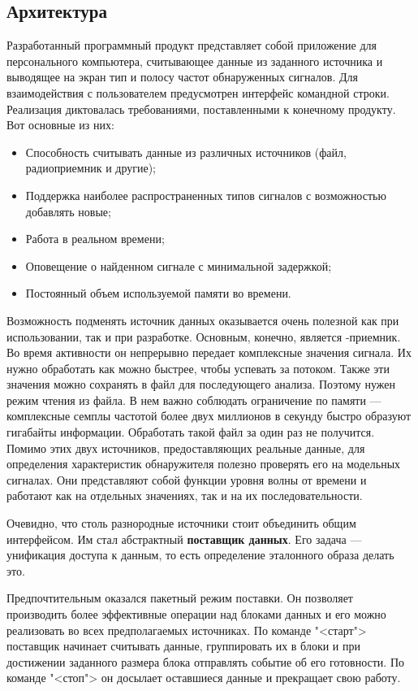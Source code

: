 \subsection{Архитектура}

Разработанный программный продукт представляет собой приложение для персонального компьютера, считывающее данные из заданного источника и выводящее на экран тип и полосу частот обнаруженных сигналов. Для взаимодействия с пользователем предусмотрен интерфейс командной строки. Реализация диктовалась требованиями, поставленными к конечному продукту. Вот основные из них:

\begin{itemize}
  \item{Способность считывать данные из различных источников (файл, радиоприемник и другие);}
  \item{Поддержка наиболее распространенных типов сигналов с возможностью добавлять новые;}
  \item{Работа в реальном времени;}
  \item{Оповещение о найденном сигнале с минимальной задержкой;}
  \item{Постоянный объем используемой памяти во времени.}
\end{itemize}

Возможность подменять источник данных оказывается очень полезной как при использовании, так и при разработке. Основным, конечно, является \SDR-приемник. Во время активности он непрерывно передает комплексные значения сигнала. Их нужно обработать как можно быстрее, чтобы успевать за потоком. Также эти значения можно сохранять в файл для последующего анализа. Поэтому нужен режим чтения из файла. В нем важно соблюдать ограничение по памяти --- комплексные семплы частотой более двух миллионов в секунду быстро образуют гигабайты информации. Обработать такой файл за один раз не получится. Помимо этих двух источников, предоставляющих реальные данные, для определения характеристик обнаружителя полезно проверять его на модельных сигналах. Они представляют собой функции уровня волны от времени и работают как на отдельных значениях, так и на их последовательности.

Очевидно, что столь разнородные источники стоит объединить общим интерфейсом. Им стал абстрактный \textbf{поставщик данных}. Его задача --- унификация доступа к данным, то есть определение эталонного образа делать это.

Предпочтительным оказался пакетный режим поставки. Он позволяет производить более эффективные операции над блоками данных и его можно реализовать во всех предполагаемых источниках. По команде "<старт"> поставщик начинает считывать данные, группировать их в блоки и при достижении заданного размера блока отправлять событие об его готовности. По команде "<стоп"> он досылает оставшиеся данные и прекращает свою работу.

